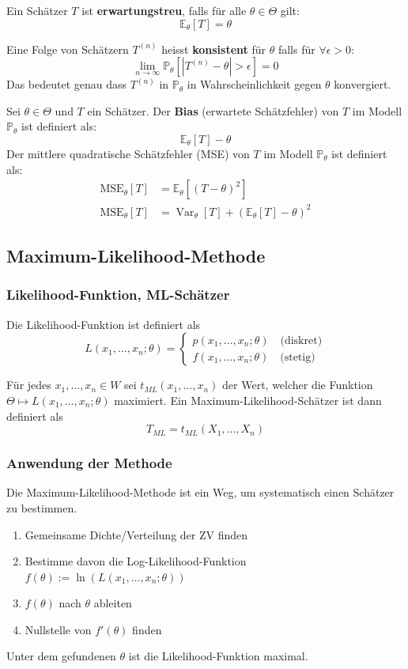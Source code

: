 \documentclass[a4paper,10pt]{article}
\def\P{\mathbb{P}}
\def\E{\mathbb{E}}
\DeclareMathOperator{\Var}{\text{Var}}
\begin{document}
Ein Schätzer \(T\) ist \textbf{erwartungstreu}, falls für alle \(\theta \in \Theta\) gilt:
\[\E_\theta [T] = \theta\]

Eine Folge von Schätzern $T^{(n)}$ heisst \textbf{konsistent} für $\theta$ falls für $\forall \epsilon > 0$:
\[ \lim_{n \to \infty} \P_\theta \left[ \left| T^{(n)} - \theta \right| > \epsilon \right] = 0 \]
Das bedeutet genau dass $T^{(n)}$ in $\P_\theta$ in Wahrscheinlichkeit gegen $\theta$ konvergiert.

Sei \(\theta \in \Theta\) und \(T\) ein Schätzer. Der \textbf{Bias} (erwartete Schätzfehler) von \(T\) im Modell \(\P_\theta\) ist definiert als:
\[\E_\theta[T]-\theta\]
Der mittlere quadratische Schätzfehler (MSE) von \(T\) im Modell \(\P_\theta\) ist definiert als:
\begin{align*}
	\text{MSE}_\theta[T] & = \E_\theta[(T-\theta)^2]                    \\
	\text{MSE}_\theta[T] & = \Var_\theta[T] + (\E_\theta[T] - \theta)^2
\end{align*}

\subsection{Maximum-Likelihood-Methode}
\subsubsection{Likelihood-Funktion, ML-Schätzer}
Die Likelihood-Funktion ist definiert als
\[L(x_1, \ldots, x_n; \theta) = \begin{cases}
		p(x_1, \ldots, x_n; \theta) \quad \text{(diskret)} \\
		f(x_1, \ldots, x_n; \theta) \quad \text{(stetig)}
	\end{cases} \]

\noindent Für jedes \(x_1, \ldots, x_n \in W\) sei \(t_{ML}(x_1, \ldots, x_n)\) der Wert, welcher die Funktion \(\Theta \mapsto L(x_1, \ldots, x_n; \theta)\) maximiert. Ein Maximum-Likelihood-Schätzer ist dann definiert als
\[T_{ML} = t_{ML}(X_1, \ldots, X_n)\]

\subsubsection{Anwendung der Methode}
Die Maximum-Likelihood-Methode ist ein Weg, um systematisch einen Schätzer zu bestimmen.
\begin{enumerate}
	\item Gemeinsame Dichte/Verteilung der ZV finden
	\item Bestimme davon die Log-Likelihood-Funktion\\ \(f(\theta) := \ln(L(x_1, \ldots, x_n;\theta))\)
	\item \(f(\theta)\) nach \(\theta\) ableiten
	\item Nullstelle von \(f'(\theta)\) finden
\end{enumerate}
Unter dem gefundenen \(\theta\) ist die Likelihood-Funktion maximal.
\end{document}
